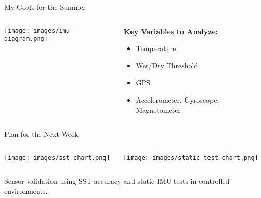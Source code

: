 \begin{frame}{My Goals for the Summer}
    \begin{columns}[c]
        \begin{column}{0.45\textwidth}
            \centering
            \texttt{[image: images/imu-diagram.png]}
        \end{column}
        \begin{column}{0.55\textwidth}
            \small
            \textbf{Key Variables to Analyze:}
            \begin{itemize}
                \item Temperature
                \item Wet/Dry Threshold
                \item GPS
                \item Accelerometer, Gyroscope, Magnetometer
            \end{itemize}
        \vspace{1em}           
        \end{column}
    \end{columns}
\end{frame}
\begin{frame}{Plan for the Next Week}
    \begin{columns}[T]
        \begin{column}{0.5\textwidth}
            \centering
            \texttt{[image: images/sst\_chart.png]}
        \end{column}
        \begin{column}{0.5\textwidth}
            \centering
            \texttt{[image: images/static\_test\_chart.png]}
        \end{column}
    \end{columns}
    \vspace{1em}
    \begin{center}
        \small Sensor validation using SST accuracy and static IMU tests in controlled environments.
    \end{center}
\end{frame}